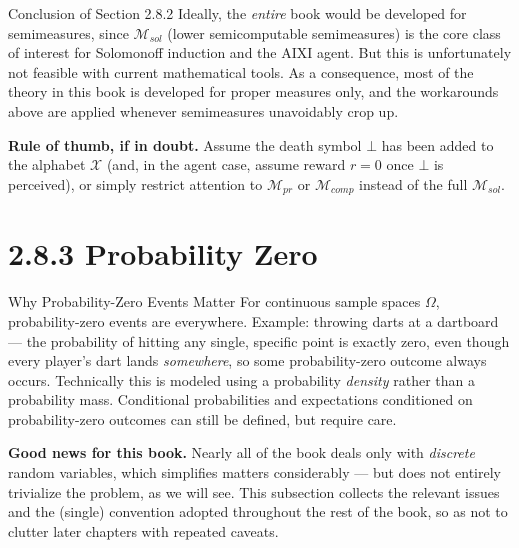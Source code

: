 \documentclass[aspectratio=169,10pt]{beamer}
\begin{document}
\begin{frame}{Conclusion of Section 2.8.2}
  Ideally, the \emph{entire} book would be developed for semimeasures,
  since $\mathcal{M}_{sol}$ (lower semicomputable semimeasures) is the core
  class of interest for Solomonoff induction and the AIXI agent. But this is
  unfortunately not feasible with current mathematical tools. As a
  consequence, most of the theory in this book is developed for proper
  measures only, and the workarounds above are applied whenever
  semimeasures unavoidably crop up.

  \textbf{Rule of thumb, if in doubt.} Assume the death symbol $\bot$ has
  been added to the alphabet $\mathcal{X}$ (and, in the agent case, assume
  reward $r=0$ once $\bot$ is perceived), or simply restrict attention to
  $\mathcal{M}_{pr}$ or $\mathcal{M}_{comp}$ instead of the full
  $\mathcal{M}_{sol}$.
\end{frame}

\section{2.8.3 Probability Zero}

\begin{frame}{Why Probability-Zero Events Matter}
  For continuous sample spaces $\Omega$, probability-zero events are
  everywhere. Example: throwing darts at a dartboard --- the probability of
  hitting any single, specific point is exactly zero, even though every
  player's dart lands \emph{somewhere}, so some probability-zero outcome
  always occurs. Technically this is modeled using a probability
  \emph{density} rather than a probability mass. Conditional probabilities
  and expectations conditioned on probability-zero outcomes can still be
  defined, but require care.

  \textbf{Good news for this book.} Nearly all of the book deals only with
  \emph{discrete} random variables, which simplifies matters considerably
  --- but does not entirely trivialize the problem, as we will see. This
  subsection collects the relevant issues and the (single) convention
  adopted throughout the rest of the book, so as not to clutter later
  chapters with repeated caveats.
\end{frame}
\end{document}

